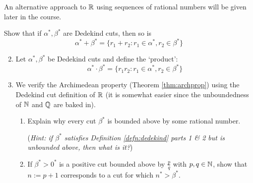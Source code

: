 An alternative approach to $\mathbb{R}$ using sequences of rational numbers will be given later in the course.


\begin{exercisessec}{}{}
	\exstart %
  Show that if $\alpha^*,\beta^*$ are Dedekind cuts, then so is
  \[\alpha^*+\beta^*=\{r_1+r_2:r_1\in\alpha^*,r_2\in\beta^*\}\]

	\begin{enumerate}\setcounter{enumi}{1}
	  \item %
	  Let $\alpha^*,\beta^*$ be Dedekind cuts and define the `product':
	  \[\alpha^*\cdot\beta^*=\{r_1r_2:r_1\in\alpha^*,r_2\in\beta^*\}\]
	  
	  \item We verify the Archimedean property (Theorem \ref{thm:archprop}) using the Dedekind cut definition of $\mathbb{R}$ (it is somewhat easier since the unboundedness of $\mathbb{N}$ and $\mathbb{Q}$ are baked in).
	  \begin{enumerate}
	    \item Explain why every cut $\beta^*$ is bounded above by some rational number.\par
	    (\emph{Hint: if $\beta^*$ satisfies Definition \ref{defn:dedekind} parts 1 \& 2 but is unbounded above, then what is it?})
	    \item If $\beta^*>0^*$ is a positive cut bounded above by $\frac pq$ with $p,q\in\mathbb{N}$, show that $n:=p+1$ corresponds to a cut for which $n^*>\beta^*$.
		\end{enumerate}
	\end{enumerate}
\end{exercisessec}